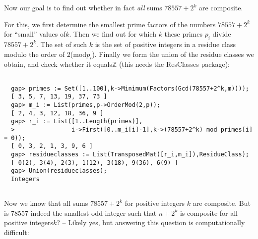 \documentclass[a4paper,11pt]{report}
\begin{document}
{{\begin{Verbatim}[fontsize=\small,frame=single,label=GAP session log]
\end{Verbatim}
 Now our goal is to find out whether in fact \emph{all} sums $78557+2^k$ are composite. 

  For this, we first determine the smallest prime factors of the numbers $78557+2^k$ for ``small'' values of{\nobreakspace}$k$. Then we find out for which $k$ these primes $p_i$ divide $78557+2^k$. The set of such $k$ is the set of positive integers in a residue class modulo the order of
2{\nobreakspace}(mod{\nobreakspace}$p_i$). Finally we form the union of the residue classes we obtain, and check
whether it equals{\nobreakspace}$\mathbb{Z}$ (this needs the \textsf{ResClasses} package{\nobreakspace}\cite{ResClasses}):          
\begin{Verbatim}[fontsize=\small,frame=single,label=GAP session log]
  
  gap> primes := Set([1..100],k->Minimum(Factors(Gcd(78557+2^k,m))));
  [ 3, 5, 7, 13, 19, 37, 73 ]
  gap> m_i := List(primes,p->OrderMod(2,p));
  [ 2, 4, 3, 12, 18, 36, 9 ]
  gap> r_i := List([1..Length(primes)],
  >                i->First([0..m_i[i]-1],k->(78557+2^k) mod primes[i] = 0));
  [ 0, 3, 2, 1, 3, 9, 6 ]
  gap> residueclasses := List(TransposedMat([r_i,m_i]),ResidueClass);
  [ 0(2), 3(4), 2(3), 1(12), 3(18), 9(36), 6(9) ]
  gap> Union(residueclasses);
  Integers
  
\end{Verbatim}
 Now we know that all sums $78557+2^k$ for positive integers $k$ are composite. But is 78557 indeed the smallest odd integer such that $n+2^k$ is composite for all positive integers{\nobreakspace}$k$? -- Likely yes, but answering this question is computationally difficult:  
\begin{Verbatim}[fontsize=\small,frame=single,label=GAP session log]
  

\end{Verbatim}}}
\end{document}
